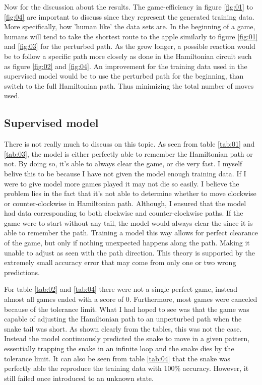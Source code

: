 \documentclass[%
 uio,
 jmp,
 amsmath,amssymb,
 reprint, nofootinbib]{revtex4-1}
\numberwithin{equation}{section}
\begin{document}
Now for the discussion about the results. The game-efficiency in figure \ref{fig:01} to \ref{fig:04} are important to discuss since they represent the generated training data. More specifically, how 'human like' the data sets are. In the beginning of a game, humans will tend to take the shortest route to the apple similarly to figure \ref{fig:01} and \ref{fig:03} for the perturbed path. As the grow longer, a possible reaction would be to follow a specific path more closely as done in the Hamiltonian circuit such as figure \ref{fig:02} and \ref{fig:04}. An improvement for the training data used in the supervised model would be to use the perturbed path for the beginning, than switch to the full Hamiltonian path. Thus minimizing the total number of moves used.


\subsection{Supervised model}

There is not really much to discuss on this topic. As seen from table \ref{tab:01}  and \ref{tab:03}, the model is either perfectly able to remember the Hamiltonian path or not. By doing so, it's able to always clear the game, or die very fast. I myself belive this to be because I have not given the model enough training data. If I were to give model more games played it may not die so easily. I believe the problem lies in the fact that it's not able to determine whether to move clockwise or counter-clockwise in Hamiltonian path. Although, I ensured that the model had data corresponding to both clockwise and counter-clockwise paths. If the game were to start without any tail, the model would always clear the since it is able to remember the path. Training a model this way allows for perfect clearance of the game, but only if nothing unexpected happens along the path. Making it unable to adjust as seen with the path direction. This theory is supported by the extremely small accuracy error that may come from only one or two wrong predictions.

For table \ref{tab:02} and \ref{tab:04} there were not a single perfect game, instead almost all games ended with a score of 0. Furthermore, most games were canceled because of the tolerance limit. What I had hoped to see was that the game was capable of adjusting the Hamiltonian path to an unperturbed path when the snake tail was short. As shown clearly from the tables, this was not the case. Instead the model continuously predicted the snake to move in a given pattern, essentially trapping the snake in an infinite loop and the snake dies by the tolerance limit. It can also be seen from table \ref{tab:04} that the snake was perfectly able the reproduce the training data with 100\% accuracy. However, it still failed once introduced to an unknown state.
\end{document}
